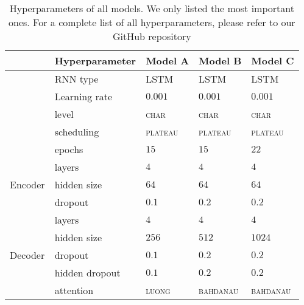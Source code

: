 \documentclass[11pt,a4paper]{article}
\begin{document}
\begin{table*}[ht]
    \centering
    \caption{Hyperparameters of all models. We only listed the most important ones. For a complete list of all hyperparameters, please refer to our GitHub repository}
    \begin{tabular}{ll|l|l|l}
                          \toprule
                             & \textbf{Hyperparameter} & \textbf{Model A} & \textbf{Model B} & \textbf{Model C} \\\midrule
                             & RNN type       & \textsc{LSTM}     & \textsc{LSTM}    & \textsc{LSTM}     \\
                             & Learning rate  & $0.001$  & $0.001$ & $0.001$  \\
                             & level          & \textsc{char}     & \textsc{char}    & \textsc{char}     \\
                             & scheduling     & \textsc{plateau}  & \textsc{plateau} & \textsc{plateau}  \\
                             & epochs         & $15$     & $15$    & $22$      \\\midrule
    \multirow{3}{*}{Encoder} & layers         & $4$      & $4$     & $4$       \\
                             & hidden size    & $64$     & $64$    & $64$      \\
                             & dropout        & $0.1$    & $0.2$   & $0.2$     \\\midrule
    \multirow{5}{*}{Decoder} & layers         & $4$      & $4$     & $4$       \\
                             & hidden size    & $256$    & $512$   & $1024$    \\
                             & dropout        & $0.1$    & $0.2$   & $0.2$     \\
                             & hidden dropout & $0.1$    & $0.2$   & $0.2$     \\
                             & attention      & \textsc{luong}    & \textsc{bahdanau} & \textsc{bahdanau}  \\    
                             \bottomrule
    \end{tabular}
    \label{tab:parameters}
\end{table*}
\end{document}
